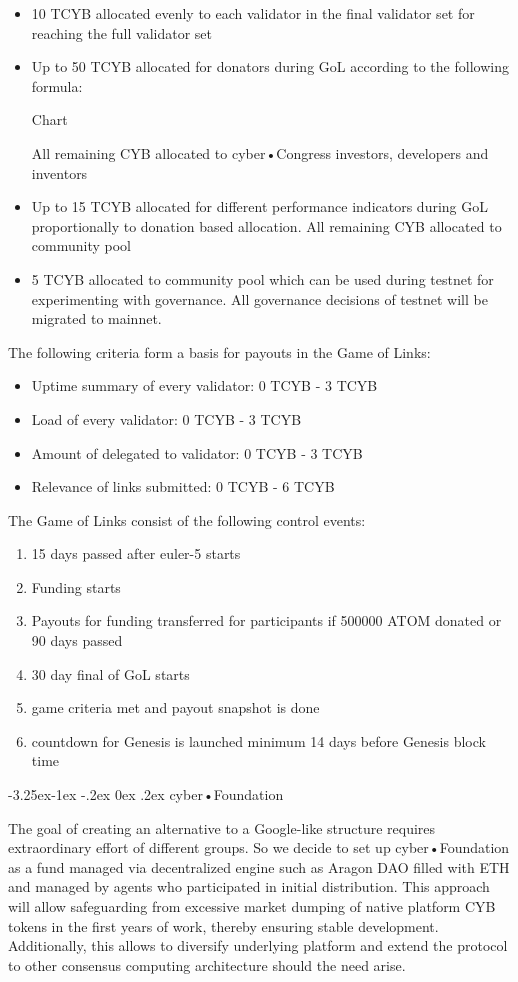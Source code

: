 \documentclass[8pt,oneside]{amsart}
\makeatletter
\renewcommand\subsection{\@startsection{subsection}{2}{\z@}%
                                     {-3.25ex\@plus -1ex \@minus -.2ex}%
                                     {0ex \@plus .2ex}%
                                     {\play\Large}}%
\newcommand{\titleSection}[1]{\subsection{#1}}
\makeatother
\begin{document}
\begin{itemize}
\item 10 TCYB allocated evenly to each validator in the final validator set for reaching the full validator set
\item Up to 50 TCYB allocated for donators during GoL according to the following formula:

Chart

All remaining CYB allocated to cyber•Congress investors, developers and inventors
\item Up to 15 TCYB allocated for different performance indicators during GoL proportionally to donation based allocation. All remaining CYB allocated to community pool
\item 5 TCYB allocated to community pool which can be used during testnet for experimenting with governance. All governance decisions of testnet will be migrated to mainnet.
\end{itemize}

The following criteria form a basis for payouts in the Game of Links:
\begin{itemize}
\item Uptime summary of every validator: 0 TCYB - 3 TCYB
\item Load of every validator: 0 TCYB - 3 TCYB
\item Amount of delegated to validator: 0 TCYB - 3 TCYB
\item Relevance of links submitted: 0 TCYB - 6 TCYB
\end{itemize}

The Game of Links consist of the following control events:
\begin{enumerate}
\item 15 days passed after euler-5 starts
\item Funding starts
\item Payouts for funding transferred for participants if 500000 ATOM donated or 90 days passed
\item 30 day final of GoL starts
\item game criteria met and payout snapshot is done
\item countdown for Genesis is launched minimum 14 days before Genesis block time
\end{enumerate}

\titleSection{cyber•Foundation}\label{joint-goal}

The goal of creating an alternative to a Google-like structure requires extraordinary effort of different groups. So we decide to set up cyber•Foundation as a fund managed via decentralized engine such as Aragon DAO filled with ETH and managed by agents who participated in initial distribution. This approach will allow safeguarding from excessive market dumping of native platform CYB tokens in the first years of work, thereby ensuring stable development. Additionally, this allows to diversify underlying platform and extend the protocol to other consensus computing architecture should the need arise.
\end{document}

